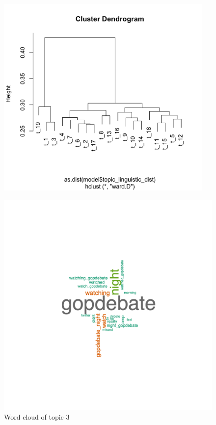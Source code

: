 \documentclass{article}
\begin{document}
\begin{figure}[H]
    \includegraphics[width=0.95\textwidth]{Fig2}
\end{figure}

\begin{figure}
    \centering
    \caption{Word cloud of topic 3}
    \includegraphics[width=1\textwidth]{Fig3}
\end{figure}
\end{document}
